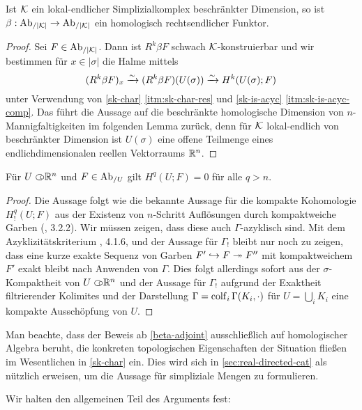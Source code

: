 \begin{lemma}
  Ist $\mathcal{K}$ ein lokal-endlicher Simplizialkomplex beschränkter
  Dimension, so ist $\beta: \operatorname{Ab}_{/|\mathcal{K}|} \to \operatorname{Ab}_{/|\mathcal{K}|}$ ein homologisch
  rechtsendlicher Funktor.
\end{lemma}
\begin{proof}
  Sei $F \in \operatorname{Ab}_{/|\mathcal{K}|}$. Dann ist $R^k \beta F$ schwach
  $\mathcal{K}$-konstruierbar und wir bestimmen für $x \in |\sigma|$ die
  Halme mittels
  \[ (R^k \beta F)_x \xrightarrow[]{\sim} (R^k \beta F)(U(\sigma)) \xrightarrow[]{\sim} H^k(U(\sigma); F) \]
  unter Verwendung von \ref{sk-char} \ref{itm:sk-char-res} und
  \ref{sk-is-acyc} \ref{itm:sk-is-acyc-comp}. Das führt die Aussage
  auf die beschränkte homologische Dimension von
  $n$-Mannigfaltigkeiten im folgenden Lemma zurück, denn für $\mathcal{K}$
  lokal-endlich von beschränkter Dimension ist $U(\sigma)$ eine offene
  Teilmenge eines endlichdimensionalen reellen Vektorraums $\mathbb{R}^n$.
\end{proof}
\begin{prop}
  Für $U \subset\kern-0.58em\circ \mathbb{R}^n$ und $F \in \operatorname{Ab}_{/U}$ gilt $H^q(U; F) = 0$ für
  alle $q > n$.
\end{prop}
\begin{proof}
  Die Aussage folgt wie die bekannte Aussage für die kompakte
  Kohomologie $H^q_!(U; F)$ aus der Existenz von $n$-Schritt
  Auflösungen durch kompaktweiche Garben (\cite{KS}, 3.2.2). Wir
  müssen zeigen, dass diese auch $\Gamma$-azyklisch sind. Mit dem
  Azyklizitätskriterium \cite{TG}, 4.1.6, und der Aussage für
  $\Gamma_!$ bleibt nur noch zu zeigen, dass eine kurze exakte Sequenz
  von Garben $F' \hookrightarrow F \twoheadrightarrow F''$ mit kompaktweichem $F'$ exakt
  bleibt nach Anwenden von $\Gamma$. Dies folgt allerdings sofort aus
  der $\sigma$-Kompaktheit von $U \subset\kern-0.58em\circ \mathbb{R}^n$ und der Aussage für
  $\Gamma_!$ aufgrund der Exaktheit filtrierender Kolimites und der
  Darstellung $\Gamma = \operatorname{colf}_i \Gamma(K_i, \cdot)$ für $U = \bigcup_i
  K_i$ eine kompakte Ausschöpfung von $U$.
\end{proof}
\begin{bem} \label{sk-homalg}
  Man beachte, dass der Beweis ab \ref{beta-adjoint} ausschließlich
  auf homologischer Algebra beruht, die konkreten topologischen
  Eigenschaften der Situation fließen im Wesentlichen in \ref{sk-char}
  ein. Dies wird sich in \autoref{sec:real-directed-cat} als nützlich
  erweisen, um die Aussage für simpliziale Mengen zu formulieren.
\end{bem}
Wir halten den allgemeinen Teil des Arguments fest:
